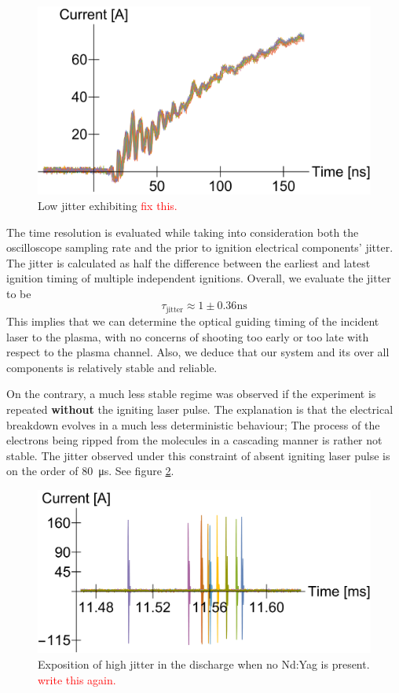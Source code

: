 \documentclass[../main.tex]{subfiles}
\begin{document}
\begin{figure}
    \centering
    \includegraphics[width=\textwidth]{figures/jitter/low_jitter.pdf}
    \caption{Low jitter exhibiting \textcolor{red}{fix this.}}
    \label{fig:low_jitter}
\end{figure}

The time resolution is evaluated while taking into consideration both the oscilloscope sampling rate and the prior to ignition electrical components' jitter. The jitter is calculated as half the difference between the earliest and latest ignition timing of multiple independent ignitions. Overall, we evaluate the jitter to be
\begin{equation}
	\tau_\text{jitter}\approx 1\pm 0.36\si{\ns}
\end{equation}
This implies that we can determine the optical guiding timing of the incident laser to the plasma, with no concerns of shooting too early or too late with respect to the plasma channel. Also, we deduce that our system and its over all components is relatively stable and reliable.

On the contrary, a much less stable regime was observed if the experiment is repeated \textbf{without} the igniting laser pulse. The explanation is that the electrical breakdown evolves in a much less deterministic behaviour; The process of the electrons being ripped from the molecules in a cascading manner is rather not stable. The jitter observed under this constraint of absent igniting laser pulse is on the order of \SI{80}{\us}. See figure \ref{fig:multiple}.
\begin{figure}
    \centering
    \includegraphics[width=\textwidth]{figures/jitter/multiple.pdf}
    \caption{Exposition of high jitter in the discharge when no Nd:Yag is present. \textcolor{red}{write this again.}}
    \label{fig:multiple}
\end{figure}
\end{document}

